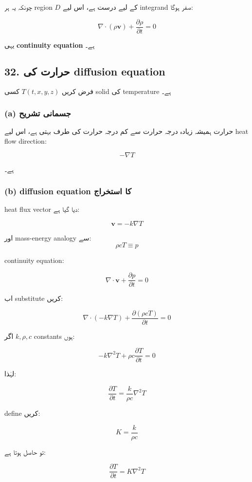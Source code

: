 \begin{enumerate}
چونکہ یہ ہر region \( D \) کے لیے درست ہے، اس لیے integrand صفر ہوگا:

\[
\nabla \cdot (\rho \mathbf{v}) + \frac{\partial \rho}{\partial t} = 0
\]

یہی \textbf{continuity equation} ہے۔

\bigskip

\subsection*{32. حرارت کی diffusion equation}

فرض کریں \( T(t,x,y,z) \) کسی solid کی temperature ہے۔

\subsubsection*{(a) جسمانی تشریح}

حرارت ہمیشہ زیادہ درجہ حرارت سے کم درجہ حرارت کی طرف بہتی ہے، اس لیے heat flow direction:

\[
-\nabla T
\]

ہے۔

\bigskip

\subsubsection*{(b) diffusion equation کا استخراج}

heat flux vector دیا گیا ہے:

\[
\mathbf{v} = -k \nabla T
\]

اور mass-energy analogy سے:
\[
\rho c T \equiv p
\]

continuity equation:

\[
\nabla \cdot \mathbf{v} + \frac{\partial p}{\partial t} = 0
\]

اب substitute کریں:

\[
\nabla \cdot (-k \nabla T) + \frac{\partial ( \rho c T)}{\partial t} = 0
\]

اگر \( k, \rho, c \) constants ہوں:

\[
-k \nabla^2 T + \rho c \frac{\partial T}{\partial t} = 0
\]

لہٰذا:

\[
\frac{\partial T}{\partial t}
=
\frac{k}{\rho c}\nabla^2 T
\]

define کریں:

\[
K = \frac{k}{\rho c}
\]

تو حاصل ہوتا ہے:

\[
\frac{\partial T}{\partial t} = K \nabla^2 T
\]


\end{enumerate}
